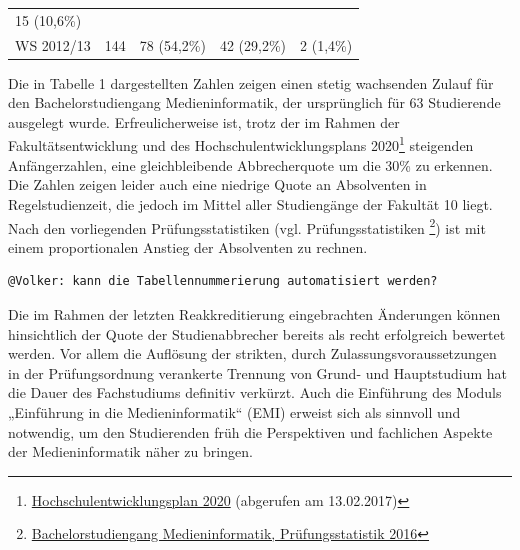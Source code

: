\begin{longtable}[]{@{}lllll@{}}
\begin{minipage}[t]{0.16\columnwidth}
15 (10,6\%)\strut
\end{minipage}\tabularnewline
\begin{minipage}[t]{0.11\columnwidth}\raggedright\strut
WS 2012/13\strut
\end{minipage} & \begin{minipage}[t]{0.23\columnwidth}\raggedright\strut
144\strut
\end{minipage} & \begin{minipage}[t]{0.22\columnwidth}\raggedright\strut
78 (54,2\%)\strut
\end{minipage} & \begin{minipage}[t]{0.14\columnwidth}\raggedright\strut
42 (29,2\%)\strut
\end{minipage} & \begin{minipage}[t]{0.16\columnwidth}\raggedright\strut
2 (1,4\%)\strut
\end{minipage}\tabularnewline
\bottomrule
\end{longtable}

Die in Tabelle 1 dargestellten Zahlen zeigen einen stetig wachsenden
Zulauf für den Bachelorstudiengang Medieninformatik, der ursprünglich
für 63 Studierende ausgelegt wurde. Erfreulicherweise ist, trotz der im
Rahmen der Fakultätsentwicklung und des Hochschulentwicklungsplans
2020\footnote{\href{https://www.verwaltung.th-koeln.de/imperia/md/content/verwaltung/broschueren_leitfaeden/hochschulentwicklungsplan2020.pdf}{Hochschulentwicklungsplan
  2020} (abgerufen am 13.02.2017)} steigenden Anfängerzahlen, eine
gleichbleibende Abbrecherquote um die 30\% zu erkennen. Die Zahlen
zeigen leider auch eine niedrige Quote an Absolventen in
Regelstudienzeit, die jedoch im Mittel aller Studiengänge der Fakultät
10 liegt. Nach den vorliegenden Prüfungsstatistiken (vgl.
Prüfungsstatistiken \footnote{\href{../anhaenge/pruefungsstatistiken.pdf}{Bachelorstudiengang
  Medieninformatik, Prüfungsstatistik 2016}}) ist mit einem
proportionalen Anstieg der Absolventen zu rechnen.

\begin{verbatim}
@Volker: kann die Tabellennummerierung automatisiert werden?
\end{verbatim}

Die im Rahmen der letzten Reakkreditierung eingebrachten Änderungen
können hinsichtlich der Quote der Studienabbrecher bereits als recht
erfolgreich bewertet werden. Vor allem die Auflösung der strikten, durch
Zulassungsvoraussetzungen in der Prüfungsordnung verankerte Trennung von
Grund- und Hauptstudium hat die Dauer des Fachstudiums definitiv
verkürzt. Auch die Einführung des Moduls „Einführung in die
Medieninformatik`` (EMI) erweist sich als sinnvoll und notwendig, um den
Studierenden früh die Perspektiven und fachlichen Aspekte der
Medieninformatik näher zu bringen.

